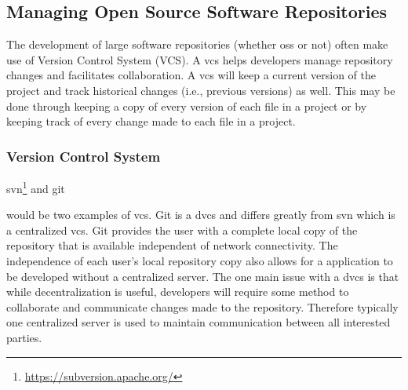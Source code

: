 \addtocounter{footnote}{-4}

\addtocounter{footnote}{1}

\addtocounter{footnote}{1}

\addtocounter{footnote}{1}

\addtocounter{footnote}{1}




\subsection{Managing Open Source Software Repositories}

The development of large software repositories (whether \gls{oss} or not) often make use of Version Control System (VCS). A \gls{vcs} helps developers manage repository changes and facilitates collaboration. A \gls{vcs} will keep a current version of the project and track historical changes (i.e., previous versions) as well. This may be done through keeping a copy of every version of each file in a project or by keeping track of every change made to each file in a project. 


\subsubsection{Version Control System}

\gls{svn}\footnote{\url{https://subversion.apache.org/}} and git\addtocounter{footnote}{-2}\footnotemark{} would be two examples of \gls{vcs}. Git is a \gls{dvcs} and differs greatly from \gls{svn} which is a centralized \gls{vcs}. Git provides the user with a complete local copy of the repository that is available independent of network connectivity. The independence of each user's local repository copy also allows for a application to be developed without a centralized server. The one main issue with a \gls{dvcs} is that while decentralization is useful, developers will require some method to collaborate and communicate changes made to the repository. Therefore typically one centralized server is used to maintain communication between all interested parties.


